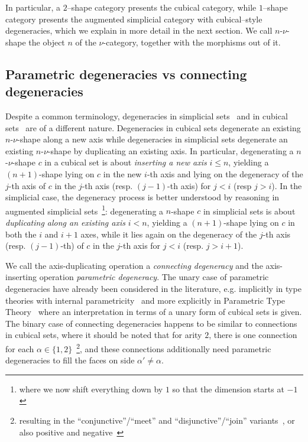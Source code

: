 \documentclass[a4paper,UKenglish,cleveref,autoref]{lipics-v2021}
\begin{document}
In particular, a $2$--shape category presents the cubical category, while $1$--shape category presents the augmented simplicial category with cubical--style degeneracies, which we explain in more detail in the next section. We call $n$-$\nu$-shape the object $n$ of the $\nu$-category, together with the morphisms out of it.

\subsection{Parametric degeneracies vs connecting degeneracies}
\label{sec:dgn-flavors}

Despite a common terminology, degeneracies in simplicial sets~\cite{fri08} and in cubical sets~\cite{grandis03} are of a different nature. Degeneracies in cubical sets degenerate an existing $n$-$\nu$-shape along a new axis while degeneracies in simplicial sets degenerate an existing $n$-$\nu$-shape by duplicating an existing axis. In particular, degenerating a $n$-$\nu$-shape $c$ in a cubical set is about \emph{inserting a new axis} $i \leq n$, yielding a $(n+1)$-shape lying on $c$ in the new $i$-th axis and lying on the degeneracy of the $j$-th axis of $c$ in the $j$-th axis (resp. $(j-1)$-th axis) for $j < i$ (resp $j > i$). In the simplicial case, the degeneracy process is better understood by reasoning in augmented simplicial sets~\footnote{where we now shift everything down by $1$ so that the dimension starts at $-1$}: degenerating a $n$-shape $c$ in simplicial sets is about \emph{duplicating along an existing axis} $i < n$, yielding a $(n+1)$-shape lying on $c$ in both the $i$ and $i+1$ axes, while it lies again on the degeneracy of the $j$-th axis (resp. $(j-1)$-th) of $c$ in the $j$-th axis for $j < i$ (resp. $j > i+1$).

We call the axis-duplicating operation a \emph{connecting degeneracy} and the axis-inserting operation \emph{parametric degeneracy}. The unary case of parametric degeneracies have already been considered in the literature, e.g. implicitly in type theories with internal parametricity~\cite{moulin16,bernardy12} and more explicitly in Parametric Type Theory~\cite{bernardy15} where an interpretation in terms of a unary form of cubical sets is given. The binary case of connecting degeneracies happens to be similar to connections in cubical sets, where it should be noted that for arity $2$, there is one connection for each $\alpha \in \{1,2\}$~\footnote{resulting in the ``conjunctive''/``meet'' and ``disjunctive''/``join'' variants~\cite{grandis03}, or also positive and negative~\cite{BrownHiggins81}}, and these connections additionally need parametric degeneracies to fill the faces on side $\alpha' \neq \alpha$.
\end{document}
